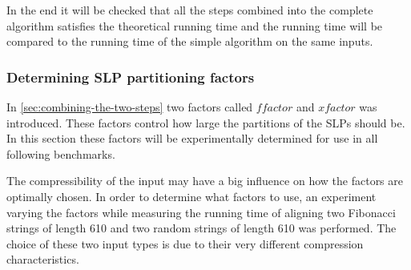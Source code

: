 \documentclass[twoside,11pt,openright]{report}
\begin{document}
In the end it will be checked that all the steps combined into the complete algorithm satisfies the theoretical running time and the running time will be compared to the running time of the simple algorithm on the same inputs.

\subsubsection{Determining SLP partitioning factors}
\label{sec:benchmark:slp-partition-factors}
In \cref{sec:combining-the-two-steps} two factors called $ffactor$ and $xfactor$ was introduced. These factors control how large the partitions of the SLPs should be. In this section these factors will be experimentally determined for use in all following benchmarks.

The compressibility of the input may have a big influence on how the factors are optimally chosen. In order to determine what factors to use, an experiment varying the factors while measuring the running time of aligning two Fibonacci strings of length 610 and two random strings of length 610 was performed. The choice of these two input types is due to their very different compression characteristics.
\end{document}
